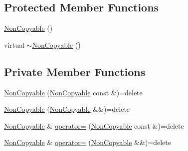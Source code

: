 \subsection*{Protected Member Functions}
\begin{DoxyCompactItemize}
\item 
\hyperlink{class_catch_1_1_non_copyable_a4b492dd5753f9952350fb64dc6cb9fe2}{Non\-Copyable} ()
\item 
virtual \hyperlink{class_catch_1_1_non_copyable_a81254677280fef337eb4a676e91e3293}{$\sim$\-Non\-Copyable} ()
\end{DoxyCompactItemize}
\subsection*{Private Member Functions}
\begin{DoxyCompactItemize}
\item 
\hyperlink{class_catch_1_1_non_copyable_a74cf3e4aa051c284941e39b436b2f693}{Non\-Copyable} (\hyperlink{class_catch_1_1_non_copyable}{Non\-Copyable} const \&)=delete
\item 
\hyperlink{class_catch_1_1_non_copyable_a09d1d8775db8c495fa40c285b034faa3}{Non\-Copyable} (\hyperlink{class_catch_1_1_non_copyable}{Non\-Copyable} \&\&)=delete
\item 
\hyperlink{class_catch_1_1_non_copyable}{Non\-Copyable} \& \hyperlink{class_catch_1_1_non_copyable_a958b5f57d45fdd6f418bec8b46a629ab}{operator=} (\hyperlink{class_catch_1_1_non_copyable}{Non\-Copyable} const \&)=delete
\item 
\hyperlink{class_catch_1_1_non_copyable}{Non\-Copyable} \& \hyperlink{class_catch_1_1_non_copyable_a317697b6d3c4cda093666ce61d3a1e31}{operator=} (\hyperlink{class_catch_1_1_non_copyable}{Non\-Copyable} \&\&)=delete
\end{DoxyCompactItemize}


